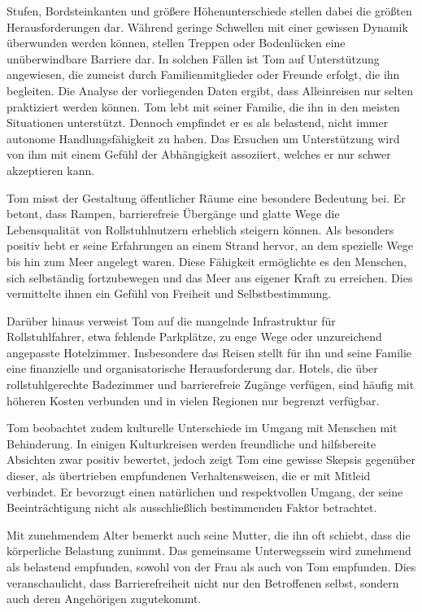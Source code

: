 Stufen, Bordsteinkanten und größere Höhenunterschiede stellen dabei die größten Herausforderungen dar. Während geringe Schwellen mit einer gewissen Dynamik überwunden werden können, stellen Treppen oder Bodenlücken eine unüberwindbare Barriere dar. In solchen Fällen ist Tom auf Unterstützung angewiesen, die zumeist durch Familienmitglieder oder Freunde erfolgt, die ihn begleiten. Die Analyse der vorliegenden 
Daten ergibt, dass Alleinreisen nur selten praktiziert werden können. Tom lebt mit seiner Familie, die ihn in den meisten Situationen unterstützt. Dennoch empfindet er es als belastend, nicht immer autonome Handlungsfähigkeit zu haben. Das Ersuchen um Unterstützung wird von ihm mit einem Gefühl der Abhängigkeit assoziiert, welches er nur schwer akzeptieren kann.

Tom misst der Gestaltung öffentlicher Räume eine besondere Bedeutung bei. Er betont, dass Rampen, 
barrierefreie Übergänge und glatte Wege die Lebensqualität von Rollstuhlnutzern erheblich steigern können. Als besonders positiv hebt er seine Erfahrungen an einem Strand hervor, an dem spezielle Wege bis hin zum Meer angelegt waren. Diese Fähigkeit ermöglichte es den Menschen, sich selbständig fortzubewegen und das Meer aus eigener Kraft zu erreichen. Dies vermittelte ihnen ein Gefühl von Freiheit und Selbstbestimmung.

Darüber hinaus verweist Tom auf die mangelnde Infrastruktur für Rollstuhlfahrer, etwa fehlende 
Parkplätze, zu enge Wege oder unzureichend angepasste Hotelzimmer. Insbesondere das Reisen stellt für ihn und seine Familie eine finanzielle und organisatorische Herausforderung dar. Hotels, die über rollstuhlgerechte Badezimmer und barrierefreie Zugänge verfügen, sind häufig mit höheren Kosten verbunden und in vielen Regionen nur begrenzt verfügbar.

Tom beobachtet zudem kulturelle Unterschiede im Umgang mit Menschen mit Behinderung. In einigen 
Kulturkreisen werden freundliche und hilfsbereite Absichten zwar positiv bewertet, jedoch zeigt Tom 
eine gewisse Skepsis gegenüber dieser, als übertrieben empfundenen Verhaltensweisen, die er mit Mitleid verbindet. Er bevorzugt einen natürlichen und respektvollen Umgang, der seine Beeinträchtigung nicht als ausschließlich bestimmenden Faktor betrachtet.

Mit zunehmendem Alter bemerkt auch seine Mutter, die ihn oft schiebt, dass die körperliche Belastung zunimmt. Das gemeinsame Unterwegssein wird zunehmend als belastend empfunden, sowohl von der Frau als auch von Tom empfunden. Dies veranschaulicht, dass Barrierefreiheit nicht nur den Betroffenen selbst, sondern auch deren Angehörigen zugutekommt.

